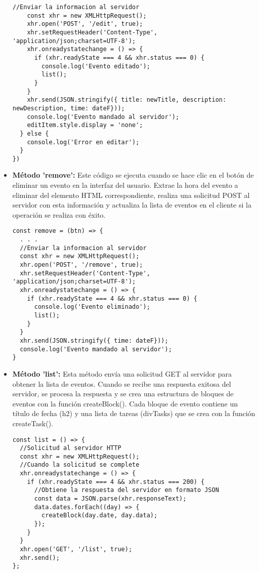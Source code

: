 \documentclass{article}
\begin{document}
\begin{itemize}
\begin{lstlisting}[style=ascii-tree]
    //Enviar la informacion al servidor
    const xhr = new XMLHttpRequest();
    xhr.open('POST', '/edit', true);
    xhr.setRequestHeader('Content-Type', 'application/json;charset=UTF-8');
    xhr.onreadystatechange = () => {
      if (xhr.readyState === 4 && xhr.status === 0) {
        console.log('Evento editado');
        list();
      }
    }
    xhr.send(JSON.stringify({ title: newTitle, description: newDescription, time: dateF}));
    console.log('Evento mandado al servidor');
    editItem.style.display = 'none';
  } else {
    console.log('Error en editar');
  }
})
\end{lstlisting}

\item{\textbf{Método 'remove':} Este código se ejecuta cuando se hace clic en el botón de eliminar un evento en la interfaz del usuario. Extrae la hora del evento a eliminar del elemento HTML correspondiente, realiza una solicitud POST al servidor con esta información y actualiza la lista de eventos en el cliente si la operación se realiza con éxito.} 
\begin{lstlisting}[style=ascii-tree]
const remove = (btn) => {
  . . .
  //Enviar la informacion al servidor
  const xhr = new XMLHttpRequest();
  xhr.open('POST', '/remove', true);
  xhr.setRequestHeader('Content-Type', 'application/json;charset=UTF-8');
  xhr.onreadystatechange = () => {
    if (xhr.readyState === 4 && xhr.status === 0) {
      console.log('Evento eliminado');
      list();
    }
  }
  xhr.send(JSON.stringify({ time: dateF}));
  console.log('Evento mandado al servidor');
}
\end{lstlisting}

\item{\textbf{Método 'list':} Esta método envía una solicitud GET al servidor para obtener la lista de eventos. Cuando se recibe una respuesta exitosa del servidor, se procesa la respuesta y se crea una estructura de bloques de eventos con la función createBlock(). Cada bloque de evento contiene un título de fecha (h2) y una lista de tareas (divTasks) que se crea con la función createTask().} 
\begin{lstlisting}[style=ascii-tree]
const list = () => {
  //Solicitud al servidor HTTP
  const xhr = new XMLHttpRequest();
  //Cuando la solicitud se complete
  xhr.onreadystatechange = () => {
    if (xhr.readyState === 4 && xhr.status === 200) {
      //Obtiene la respuesta del servidor en formato JSON
      const data = JSON.parse(xhr.responseText);
      data.dates.forEach((day) => {
        createBlock(day.date, day.data);
      });
    }
  }
  xhr.open('GET', '/list', true);
  xhr.send();
};
\end{lstlisting}


\end{itemize}
\end{document}
